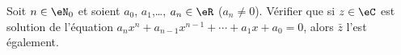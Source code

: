 \begin{exercice}\label{exoJanvier003}

Soit $n\in\eN_0$ et soient $a_0$, $a_1$,\ldots, $a_n\in\eR$ ($a_n\neq 0$). Vérifier que si $z\in\eC$ est solution de l'équation $a_nx^n+a_{n-1}x^{n-1}+\cdots+a_1x+a_0=0$, alors $\bar z$ l'est également.

\end{exercice}
